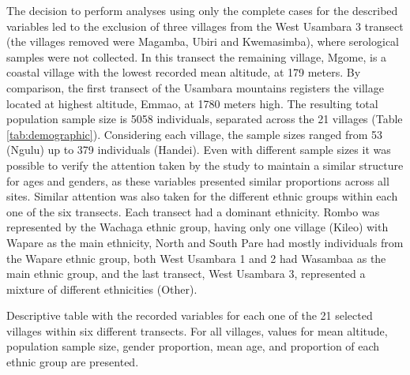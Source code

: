 The decision to perform analyses using only the complete cases for the described variables led to the exclusion of three villages from the West Usambara 3 transect (the villages removed were Magamba, Ubiri and Kwemasimba), where serological samples were not collected.
In this transect the remaining village, Mgome, is a coastal village with the lowest recorded mean altitude, at 179 meters.
By comparison, the first transect of the Usambara mountains registers the village located at highest altitude, Emmao, at 1780 meters high.
The resulting total population sample size is 5058 individuals, separated across the 21 villages (Table \ref{tab:demographic}).
Considering each village, the sample sizes ranged from 53 (Ngulu) up to 379 individuals (Handei).
Even with different sample sizes it was possible to verify the attention taken by the study to maintain a similar structure for ages and genders, as these variables presented similar proportions across all sites.
Similar attention was also taken for the different ethnic groups within each one of the six transects.
Each transect had a dominant ethnicity.
Rombo was represented by the Wachaga ethnic group, having only one village (Kileo) with Wapare as the main ethnicity, North and South Pare had mostly individuals from the Wapare ethnic group, both West Usambara 1 and 2 had Wasambaa as the main ethnic group, and the last transect, West Usambara 3, represented a mixture of different ethnicities (Other).
\\

\begin{table}[ht!]
\centering
\caption[Variables recorded for each village]{Descriptive table with the recorded variables for each one of the 21 selected villages within six different transects.
For all villages, values for mean altitude, population sample size, gender proportion, mean age, and proportion of each ethnic group are presented.}
\label{tab:demographic}
\begin{adjustbox}{width=1\linewidth}

\end{adjustbox}
\end{table}


